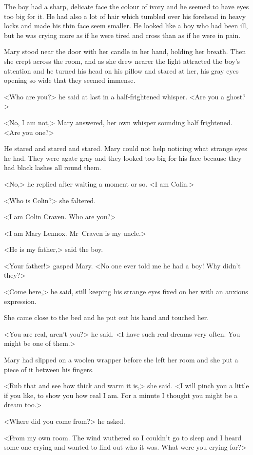 The boy had a sharp, delicate face the colour of ivory and he seemed to have eyes too big for it. He had also a lot of hair which tumbled over his forehead in heavy locks and made his thin face seem smaller. He looked like a boy who had been ill, but he was crying more as if he were tired and cross than as if he were in pain.

Mary stood near the door with her candle in her hand, holding her breath. Then she crept across the room, and as she drew nearer the light attracted the boy's attention and he turned his head on his pillow and stared at her, his gray eyes opening so wide that they seemed immense.

<Who are you?> he said at last in a half-frightened whisper. <Are you a ghost?>

<No, I am not,> Mary answered, her own whisper sounding half frightened. <Are you one?>

He stared and stared and stared. Mary could not help noticing what strange eyes he had. They were agate gray and they looked too big for his face because they had black lashes all round them.

<No,> he replied after waiting a moment or so. <I am Colin.>

<Who is Colin?> she faltered.

<I am Colin Craven. Who are you?>

<I am Mary Lennox. Mr~Craven is my uncle.>

<He is my father,> said the boy.

<Your father!> gasped Mary. <No one ever told me he had a boy! Why didn't they?>

<Come here,> he said, still keeping his strange eyes fixed on her with an anxious expression.

She came close to the bed and he put out his hand and touched her.

<You are real, aren't you?> he said. <I have such real dreams very often. You might be one of them.>

Mary had slipped on a woolen wrapper before she left her room and she put a piece of it between his fingers.

<Rub that and see how thick and warm it is,> she said. <I will pinch you a little if you like, to show you how real I am. For a minute I thought you might be a dream too.>

<Where did you come from?> he asked.

<From my own room. The wind wuthered so I couldn't go to sleep and I heard some one crying and wanted to find out who it was. What were you crying for?>

